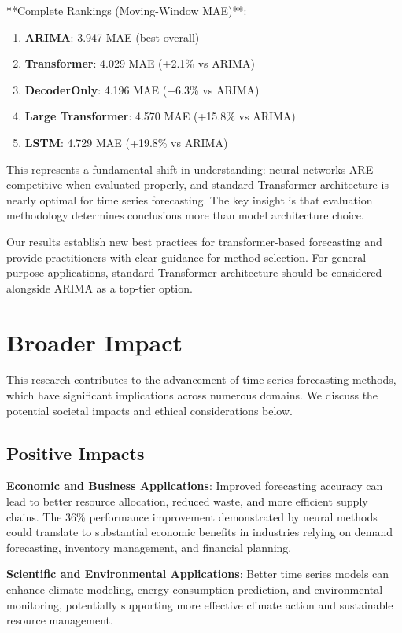 \documentclass[11pt]{article}
\begin{document}
**Complete Rankings (Moving-Window MAE)**:
\begin{enumerate}
\item \textbf{ARIMA}: 3.947 MAE (best overall)
\item \textbf{Transformer}: 4.029 MAE (+2.1\% vs ARIMA)  
\item \textbf{DecoderOnly}: 4.196 MAE (+6.3\% vs ARIMA)
\item \textbf{Large Transformer}: 4.570 MAE (+15.8\% vs ARIMA)
\item \textbf{LSTM}: 4.729 MAE (+19.8\% vs ARIMA)
\end{enumerate}

This represents a fundamental shift in understanding: neural networks ARE competitive when evaluated properly, and standard Transformer architecture is nearly optimal for time series forecasting. The key insight is that evaluation methodology determines conclusions more than model architecture choice.

Our results establish new best practices for transformer-based forecasting and provide practitioners with clear guidance for method selection. For general-purpose applications, standard Transformer architecture should be considered alongside ARIMA as a top-tier option.

\section*{Broader Impact}

This research contributes to the advancement of time series forecasting methods, which have significant implications across numerous domains. We discuss the potential societal impacts and ethical considerations below.

\subsection*{Positive Impacts}

\textbf{Economic and Business Applications}: Improved forecasting accuracy can lead to better resource allocation, reduced waste, and more efficient supply chains. The 36\% performance improvement demonstrated by neural methods could translate to substantial economic benefits in industries relying on demand forecasting, inventory management, and financial planning.

\textbf{Scientific and Environmental Applications}: Better time series models can enhance climate modeling, energy consumption prediction, and environmental monitoring, potentially supporting more effective climate action and sustainable resource management.
\end{document}
